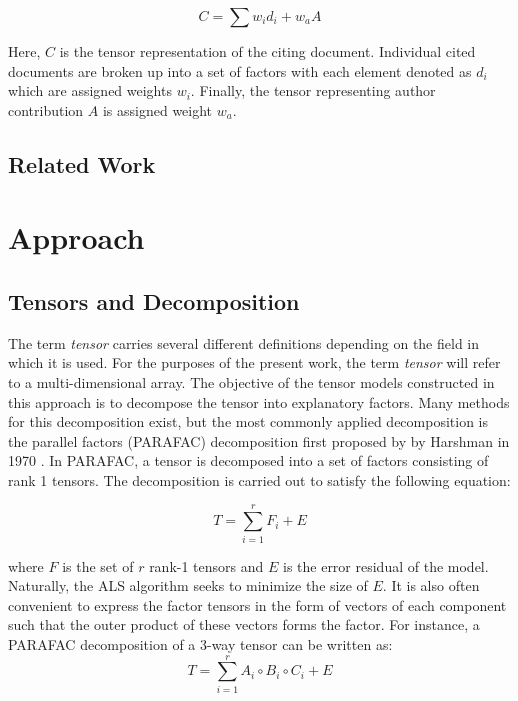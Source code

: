 \documentclass{article}
\begin{document}
\begin{equation}
    \label{eq:model}
    C = \sum w_id_i + w_a A
\end{equation}

Here, $C$ is the tensor representation of the citing document.
Individual cited documents are broken up into a set of factors with
each element denoted as $d_i$ which are assigned weights $w_i$.  Finally,
the tensor representing author contribution $A$ is assigned weight
$w_a$.  

\subsection{Related Work}

\section{Approach}
\subsection{Tensors and Decomposition}
The term {\em tensor} carries several different definitions depending
on the field in which it is used.  For the purposes of the present
work, the term {\em tensor} will refer to a multi-dimensional array.
The objective of the tensor models constructed in this approach is to
decompose the tensor into explanatory factors.  Many methods for this
decomposition exist, but the most commonly applied decomposition is
the parallel factors (PARAFAC) decomposition first proposed by by
Harshman in 1970 \cite{harshman1970}.  In PARAFAC, a tensor is
decomposed into a set of factors consisting of rank 1 tensors.  The
decomposition is carried out to satisfy the following equation:

\begin{equation}
    \label{eq:parafac}
    T = \displaystyle\sum_{i=1}^{r} F_i + E
\end{equation}

where $F$ is the set of $r$ rank-1 tensors and $E$ is the error
residual of the model.  Naturally, the ALS algorithm seeks to minimize
the size of $E$.  It is also often convenient to express the factor
tensors in the form of vectors of each component such that the outer
product of these vectors forms the factor.  For instance,
a PARAFAC decomposition of a 3-way tensor can be written as:
\begin{equation}
    \label{eq:parafac-comp}
    T = \displaystyle\sum_{i=1}^{r} A_i \circ B_i \circ C_i + E
\end{equation}
\end{document}

